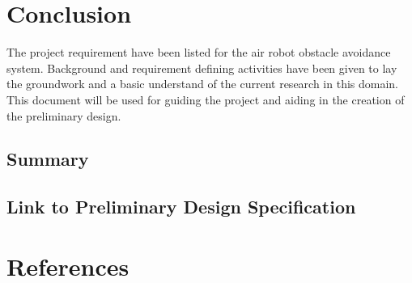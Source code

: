 \documentclass[]{report}
\begin{document}
\chapter{Conclusion}

The project requirement have been listed for the air robot obstacle avoidance system. Background and requirement defining activities have been given to lay the groundwork and a basic understand of the current research in this domain. This document will be used for guiding the project and aiding in the creation of the preliminary design. 

\section{Summary}

\section{Link to Preliminary Design Specification}

\chapter*{References}

\printbibliography
\end{document}

